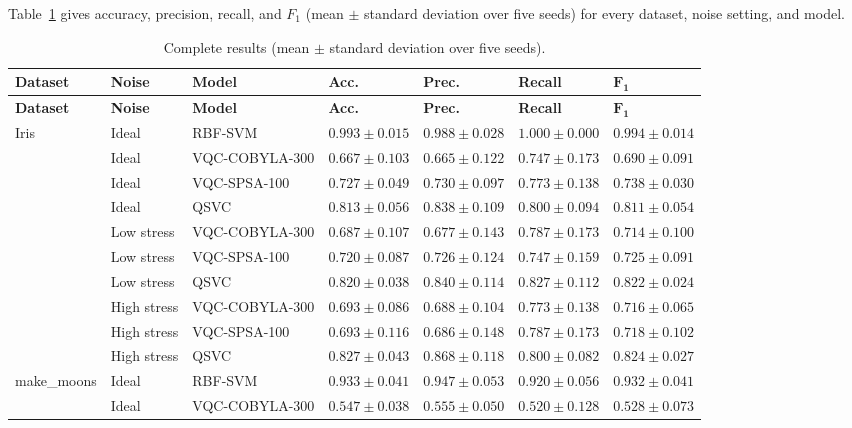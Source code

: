 \documentclass[12pt,a4paper]{article}
\newcommand{\chgcolor}{blue}
\begin{document}
Table~\ref{tab:full} gives accuracy, precision, recall, and $F_1$ (mean $\pm$ standard
deviation over five seeds) for every dataset, noise setting, and model.

{\footnotesize
\setlength{\tabcolsep}{1.2pt}
\renewcommand{\arraystretch}{1.15}
{\color{\chgcolor}
\begin{longtable}{lllllll}
\caption{Complete results (mean $\pm$ standard deviation over five seeds).}
\label{tab:full}\\
\toprule
\textbf{Dataset} & \textbf{Noise} & \textbf{Model} & \textbf{Acc.} & \textbf{Prec.} & \textbf{Recall} & $\boldsymbol{F_1}$ \\
\midrule
\endfirsthead
\toprule
\textbf{Dataset} & \textbf{Noise} & \textbf{Model} & \textbf{Acc.} & \textbf{Prec.} & \textbf{Recall} & $\boldsymbol{F_1}$ \\
\midrule
\endhead
\bottomrule
\endfoot
Iris & Ideal & RBF-SVM & $0.993\pm0.015$ & $0.988\pm0.028$ & $1.000\pm0.000$ & $0.994\pm0.014$ \\
 & Ideal & VQC-COBYLA-300 & $0.667\pm0.103$ & $0.665\pm0.122$ & $0.747\pm0.173$ & $0.690\pm0.091$ \\
 & Ideal & VQC-SPSA-100 & $0.727\pm0.049$ & $0.730\pm0.097$ & $0.773\pm0.138$ & $0.738\pm0.030$ \\
 & Ideal & QSVC & $0.813\pm0.056$ & $0.838\pm0.109$ & $0.800\pm0.094$ & $0.811\pm0.054$ \\
 & Low stress & VQC-COBYLA-300 & $0.687\pm0.107$ & $0.677\pm0.143$ & $0.787\pm0.173$ & $0.714\pm0.100$ \\
 & Low stress & VQC-SPSA-100 & $0.720\pm0.087$ & $0.726\pm0.124$ & $0.747\pm0.159$ & $0.725\pm0.091$ \\
 & Low stress & QSVC & $0.820\pm0.038$ & $0.840\pm0.114$ & $0.827\pm0.112$ & $0.822\pm0.024$ \\
 & High stress & VQC-COBYLA-300 & $0.693\pm0.086$ & $0.688\pm0.104$ & $0.773\pm0.138$ & $0.716\pm0.065$ \\
 & High stress & VQC-SPSA-100 & $0.693\pm0.116$ & $0.686\pm0.148$ & $0.787\pm0.173$ & $0.718\pm0.102$ \\
 & High stress & QSVC & $0.827\pm0.043$ & $0.868\pm0.118$ & $0.800\pm0.082$ & $0.824\pm0.027$ \\
\midrule
make\_moons & Ideal & RBF-SVM & $0.933\pm0.041$ & $0.947\pm0.053$ & $0.920\pm0.056$ & $0.932\pm0.041$ \\
 & Ideal & VQC-COBYLA-300 & $0.547\pm0.038$ & $0.555\pm0.050$ & $0.520\pm0.128$ & $0.528\pm0.073$ \\

\end{longtable}}}
\end{document}
